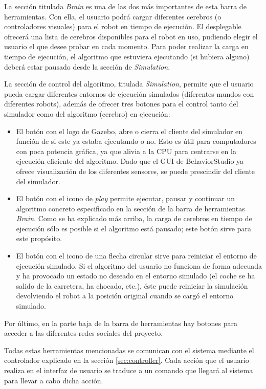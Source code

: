 La sección titulada \textit{Brain} es una de las dos más importantes de esta barra de herramientas. Con ella, el usuario podrá cargar diferentes cerebros (o controladores visuales) para el robot en tiempo de ejecución. El desplegable ofrecerá una lista de cerebros disponibles para el robot en uso, pudiendo elegir el usuario el que desee probar en cada momento. Para poder realizar la carga en tiempo de ejecución, el algoritmo que estuviera ejecutando (si hubiera alguno) deberá estar pausado desde la sección de \textit{Simulation}.

La sección de control del algoritmo, titulada \textit{Simulation}, permite que el usuario pueda cargar diferentes entornos de ejecución simulados (diferentes mundos con diferentes robots), además de ofrecer tres botones para el control tanto del simulador como del algoritmo (cerebro) en ejecución:

\begin{itemize}
    \item El botón con el logo de Gazebo, abre o cierra el cliente del simulador en función de si este ya estaba ejecutando o no. Esto es útil para computadores con poca potencia gráfica, ya que alivia a la CPU para centrarse en la ejecución eficiente del algoritmo. Dado que el GUI de BehaviorStudio ya ofrece visualización de los diferentes sensores, se puede prescindir del cliente del simulador.
    \item El botón con el icono de \textit{play} permite ejecutar, pausar y continuar un algoritmo concreto especificado en la sección de la barra de herramientas \textit{Brain}. Como se ha explicado más arriba, la carga de cerebros en tiempo de ejecución sólo es posible si el algoritmo está pausado; este botón sirve para este propósito.
    \item El botón con el icono de una flecha circular sirve para reiniciar el entorno de ejecución simulado. Si el algoritmo del usuario no funciona de forma adecuada y ha provocado un estado no deseado en el entorno simulado (el coche se ha salido de la carretera, ha chocado, etc.), éste puede reiniciar la simulación devolviendo el robot a la posición original cuando se cargó el entorno simulado.
\end{itemize}


Por último, en la parte baja de la barra de herramientas hay botones para acceder a las diferentes redes sociales del proyecto.

Todas estas herramientas mencionadas se comunican con el sistema mediante el controlador explicado en la sección \ref{sec:controller}. Cada acción que el usuario realiza en el interfaz de usuario se traduce a un comando que llegará al sistema para llevar a cabo dicha acción.


